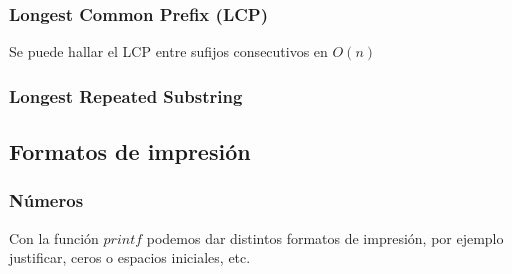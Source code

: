 \documentclass[10pt,letterpaper,twocolumn]{article}
\newcommand{\source}[1]{
  
  \dotfill
}
\begin{document}
	\subsubsection{Longest Common Prefix (LCP)}
	Se puede hallar el LCP entre sufijos consecutivos en $O(n)$
	\source{./src/sufix-Array-Trie/SufixArrayLCP.cpp}
	
	\subsubsection{Longest Repeated Substring}
		\source{./src/sufix-Array-Trie/SufixArrayLRS.cpp}
		
		
	
		
  \subsection{Formatos de impresión}
    \subsubsection{Números}
    Con la función $printf$ podemos dar distintos formatos de impresión, por ejemplo justificar, ceros o espacios iniciales, etc.
      \source{./src/printFormat.cpp}
\end{document}
